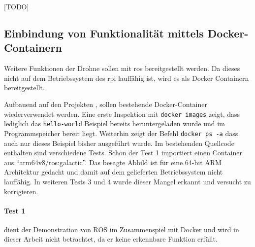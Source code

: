 [TODO]

\subsection{Einbindung von Funktionalität mittels Docker-Containern}
Weitere Funktionen der Drohne sollen mit \gls{ros} bereitgestellt werden. Da dieses nicht auf dem Betriebssystem des \gls{rpi} lauffähig ist, wird es als Docker Containern bereitgestellt.

Aufbauend auf den Projekten \cite{wirthErweiterungBestehendenDrohne2022}, \cite{wirthErweiterungBestehendenDrohne2022a} sollen bestehende Docker-Container wiederverwendet werden. Eine erste Inspektion mit \texttt{docker images} zeigt, dass lediglich das \texttt{hello-world} Beispiel bereits heruntergeladen wurde und im Programmspeicher bereit liegt. Weiterhin zeigt der Befehl \texttt{docker ps -a} dass auch nur dieses Beispiel bisher ausgeführt wurde. Im bestehenden Quellcode enthalten sind verschiedene Tests. Schon der Test 1 importiert einen Container aus \enquote{arm64v8/ros:galactic}. Das besagte Abbild ist für eine 64-bit ARM Architektur gedacht und damit auf dem gelieferten Betriebssystem nicht lauffähig. In weiteren Tests 3 und 4 wurde dieser Mangel erkannt und versucht zu korrigieren.

\paragraph*{Test 1} dient der Demonstration von ROS im Zusammenspiel mit Docker und wird in dieser Arbeit nicht betrachtet, da er keine erkennbare Funktion erfüllt.

